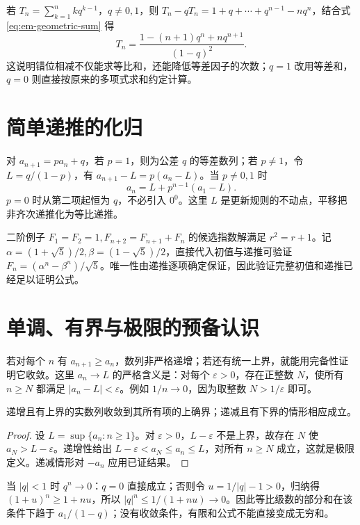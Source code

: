 若 $T_n=\sum_{k=1}^n kq^{k-1}$，$q\ne0,1$，则 $T_n-qT_n=1+q+\cdots+q^{n-1}-nq^n$，结合式 \eqref{eq:em-geometric-sum} 得
\[
 T_n=\frac{1-(n+1)q^n+nq^{n+1}}{(1-q)^2}.
\]
这说明错位相减不仅能求等比和，还能降低等差因子的次数；$q=1$ 改用等差和，$q=0$ 则直接按原来的多项式求和约定计算。

\section{简单递推的化归}
对 $a_{n+1}=pa_n+q$，若 $p=1$，则为公差 $q$ 的等差数列；若 $p\ne1$，令 $L=q/(1-p)$，有 $a_{n+1}-L=p(a_n-L)$。当 $p\ne0,1$ 时
\[
 a_n=L+p^{n-1}(a_1-L).
\]
$p=0$ 时从第二项起恒为 $q$，不必引入 $0^0$。这里 $L$ 是更新规则的不动点，平移把非齐次递推化为等比递推。

二阶例子 $F_1=F_2=1,F_{n+2}=F_{n+1}+F_n$ 的候选指数解满足 $r^2=r+1$。记 $\alpha=(1+\sqrt5)/2,\beta=(1-\sqrt5)/2$，直接代入初值与递推可验证 $F_n=(\alpha^n-\beta^n)/\sqrt5$。唯一性由递推逐项确定保证，因此验证完整初值和递推已经足以证明公式。

\section{单调、有界与极限的预备认识}
若对每个 $n$ 有 $a_{n+1}\ge a_n$，数列非严格递增；若还有统一上界，就能用完备性证明它收敛。这里 $a_n\to L$ 的严格含义是：对每个 $\varepsilon>0$，存在正整数 $N$，使所有 $n\ge N$ 都满足 $|a_n-L|<\varepsilon$。例如 $1/n\to0$，因为取整数 $N>1/\varepsilon$ 即可。

\begin{theorem}[单调有界收敛]
递增且有上界的实数列收敛到其所有项的上确界；递减且有下界的情形相应成立。
\end{theorem}
\begin{proof}
设 $L=\sup\{a_n:n\ge1\}$。对 $\varepsilon>0$，$L-\varepsilon$ 不是上界，故存在 $N$ 使 $a_N>L-\varepsilon$。递增性给出 $L-\varepsilon<a_N\le a_n\le L$，对所有 $n\ge N$ 成立，这就是极限定义。递减情形对 $-a_n$ 应用已证结果。
\end{proof}
当 $|q|<1$ 时 $q^n\to0$：$q=0$ 直接成立；否则令 $u=1/|q|-1>0$，归纳得 $(1+u)^n\ge1+nu$，所以 $|q|^n\le1/(1+nu)\to0$。因此等比级数的部分和在该条件下趋于 $a_1/(1-q)$；没有收敛条件，有限和公式不能直接变成无穷和。

